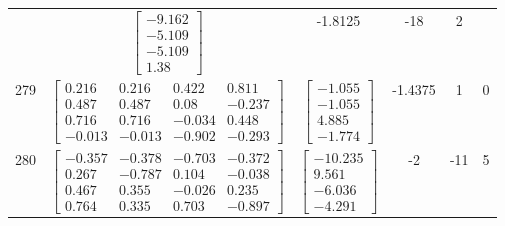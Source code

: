 \documentclass[a4paper,12pt]{article}
\begin{document}
\begin{tabular}{c c c c c c}
&
$\begin{bmatrix} -9.162 \\ -5.109 \\ -5.109 \\ 1.38 \end{bmatrix}$
&
-1.8125
&
-18
&
2
\\
279
&
$\begin{bmatrix} 0.216 & 0.216 & 0.422 & 0.811 \\ 0.487 & 0.487 & 0.08 & -0.237 \\ 0.716 & 0.716 & -0.034 & 0.448 \\ -0.013 & -0.013 & -0.902 & -0.293 \end{bmatrix}$
&
$\begin{bmatrix} -1.055 \\ -1.055 \\ 4.885 \\ -1.774 \end{bmatrix}$
&
-1.4375
&
1
&
0
\\
280
&
$\begin{bmatrix} -0.357 & -0.378 & -0.703 & -0.372 \\ 0.267 & -0.787 & 0.104 & -0.038 \\ 0.467 & 0.355 & -0.026 & 0.235 \\ 0.764 & 0.335 & 0.703 & -0.897 \end{bmatrix}$
&
$\begin{bmatrix} -10.235 \\ 9.561 \\ -6.036 \\ -4.291 \end{bmatrix}$
&
-2
&
-11
&
5
\\
\end{tabular} \egroup \newpage
\end{document}
